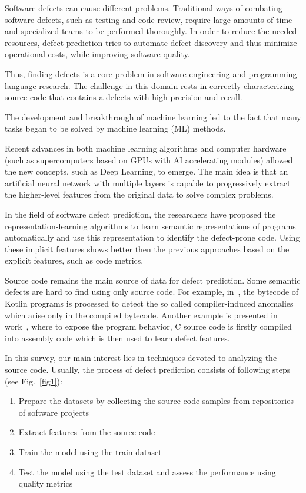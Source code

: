 \documentclass{article}
\begin{document}
Software defects can cause different problems.
Traditional ways of combating software defects, such as testing and code review, require large amounts of time and specialized teams to be performed thoroughly.
In order to reduce the needed resources, defect prediction tries to automate defect discovery and thus minimize operational costs, while improving software quality.

Thus, finding defects is a core problem in software engineering and programming language research.
The challenge in this domain rests in correctly characterizing source code that contains a defects with high precision and recall.

The development and breakthrough of machine learning led to the fact that many tasks began to be solved by machine learning (ML) methods.

Recent advances in both machine learning algorithms and computer hardware (such as supercomputers based on GPUs with AI accelerating modules) allowed the new concepts, such as Deep Learning, to emerge.
The main idea is that an artificial neural network with multiple layers is capable to progressively extract the higher-level features from the original data to solve complex problems.

In the field of software defect prediction, the researchers have proposed the representation-learning algorithms to learn semantic representations of programs automatically and use this representation to identify the defect-prone code. Using these implicit features shows better then the previous approaches based on the explicit features, such as code metrics.

Source code remains the main source of data for defect prediction. 
Some semantic defects are hard to find using only source code. For example, in~\cite{BryksinEtAl2020}, the bytecode of Kotlin programs is processed to detect the so called compiler-induced anomalies which arise only in the compiled bytecode. Another example is presented in work~\cite{PhanNguyen2017}, where to expose the program behavior, C source code is firstly compiled into assembly code which is then used to learn defect features.

In this survey, our main interest lies in techniques devoted to analyzing the source code. Usually, the process of defect prediction consists of following steps (see Fig.~\ref{fig1}):
\begin{enumerate}
\item Prepare the datasets by collecting the source code samples from repositories of software projects
\item Extract features from the source code
\item Train the model using the train dataset
\item Test the model using the test dataset and assess the performance using quality metrics
\end{enumerate}
\end{document}
